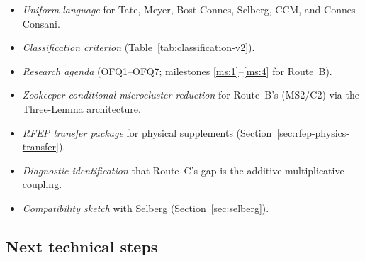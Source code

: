 \documentclass[11pt,a4paper]{article}
\theoremstyle{plain}
\theoremstyle{definition}
\begin{document}
\begin{itemize}
\item \emph{Uniform language} for Tate, Meyer, Bost-Connes, Selberg,
  CCM, and Connes-Consani.
\item \emph{Classification criterion}
  (Table~\ref{tab:classification-v2}).
\item \emph{Research agenda} (OFQ1--OFQ7; milestones
  \ref{ms:1}--\ref{ms:4} for Route~B).
\item \emph{Zookeeper conditional microcluster reduction} for
  Route~B's (MS2/C2) via the Three-Lemma architecture.
\item \emph{RFEP transfer package} for physical supplements
  (Section~\ref{sec:rfep-physics-transfer}).
\item \emph{Diagnostic identification} that Route~C's gap is the
  additive-multiplicative coupling.
\item \emph{Compatibility sketch} with Selberg
  (Section~\ref{sec:selberg}).
\end{itemize}

\subsection{Next technical steps}
\end{document}
